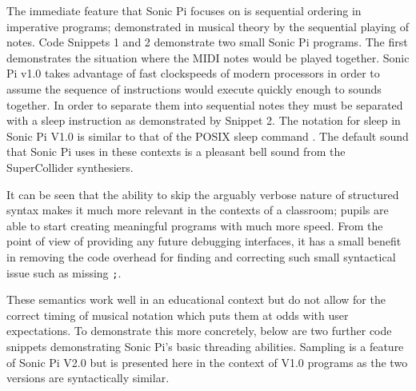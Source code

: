 \documentclass[11pt, abstracton, twoside, titlepage=true]{scrartcl}
\begin{document}
The immediate feature that Sonic Pi focuses on is sequential ordering in 
imperative programs; demonstrated in musical theory by the sequential playing 
of notes. Code Snippets 1 and 2 demonstrate two small Sonic Pi programs. The 
first demonstrates the situation where the MIDI notes would be played together. 
Sonic Pi v1.0 takes advantage of fast clockspeeds of modern processors in order 
to assume the sequence of instructions would execute quickly enough 
to sounds together. In order to separate them into sequential notes they must 
be separated with a sleep instruction as demonstrated by Snippet 2. The notation 
for sleep in Sonic Pi V1.0 is similar to that of the POSIX sleep command 
\cite{IG13}. The default sound that Sonic Pi uses in these contexts is a 
pleasant bell sound from the SuperCollider synthesiers.

It can be seen that the ability to skip the arguably verbose nature of 
structured syntax makes it much more relevant in the contexts of a classroom; 
pupils are able to start creating meaningful programs with much more speed. From 
the point of view of providing any future debugging interfaces, it has a small 
benefit in removing the code overhead for finding and correcting such small 
syntactical issue such as missing \texttt{;}. 

These semantics work well in an educational context but do not allow for the 
correct timing of musical notation which puts them at odds with user 
expectations. To demonstrate this more concretely, below are two further code 
snippets demonstrating Sonic Pi's basic threading abilities. Sampling is a 
feature of Sonic Pi V2.0 but is presented here in the context of V1.0 
programs as the two versions are syntactically similar.
\end{document}
